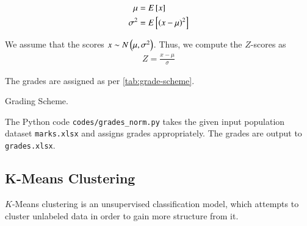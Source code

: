 \documentclass[conference]{IEEEtran}
\begin{document}
\begin{align}
    \mu &= E\left[ x \right] \\
    \sigma^2 &= E\left[ \left(x-\mu\right)^2 \right]
    \label{eq:pop-param}
\end{align}

We assume that the scores $x \sim N\left(\mu,\sigma^2\right)$. Thus, we compute the
$Z$-scores as
\begin{align}
    Z = \frac{x-\mu}{\sigma}
\end{align}

The grades are assigned as per \autoref{tab:grade-scheme}.
\begin{table}[!ht]
    \centering
    
    \caption{Grading Scheme.}
    \label{tab:grade-scheme}
\end{table}

The Python code \texttt{codes/grades\_norm.py} takes the given input 
population dataset \texttt{marks.xlsx} and assigns grades appropriately. 
The grades are output to \texttt{grades.xlsx}.

\subsection{K-Means Clustering}
$K$-Means clustering is an unsupervised classification model, which attempts to 
cluster unlabeled data in order to gain more structure from it. 
\end{document}

